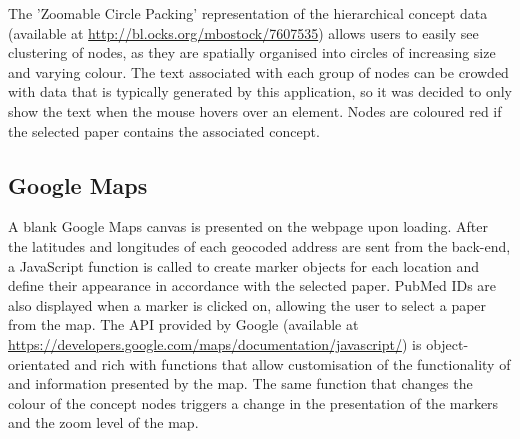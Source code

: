 \documentclass[Report.tex]{subfiles}
\begin{document}
\noindent The 'Zoomable Circle Packing' representation of the hierarchical concept data (available at \url{http://bl.ocks.org/mbostock/7607535}) allows users to easily see clustering of nodes, as they are spatially organised into circles of increasing size and varying colour. The text associated with each group of nodes can be crowded with data that is typically generated by this application, so it was decided to only show the text when the mouse hovers over an element. Nodes are coloured red if the selected paper contains the associated concept.

\subsection{Google Maps}
A blank Google Maps canvas is presented on the webpage upon loading. After the latitudes and longitudes of each geocoded address are sent from the back-end, a JavaScript function is called to create marker objects for each location and define their appearance in accordance with the selected paper. PubMed IDs are also displayed when a marker is clicked on, allowing the user to select a paper from the map. The API provided by Google (available at \url{https://developers.google.com/maps/documentation/javascript/}) is object-orientated and rich with functions that allow customisation of the functionality of and information presented by the map. The same function that changes the colour of the concept nodes triggers a change in the presentation of the markers and the zoom level of the map.
\end{document}
